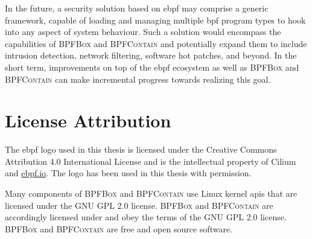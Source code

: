 \documentclass[
  fontsize=12pt,
  titlepage=firstiscover,
  paper=letter,
oneside,
  cleardoublepage=plain,
  parskip=half-,
  DIV=10,
  parindent,
  appendixprefix,
  chapterprefix,
  listof=totoc,
]{scrbook}
\newcommand{\bpfbox}{\textsc{BPFBox}}
\newcommand{\bpfcontain}{\textsc{BPFContain}}
\begin{document}
In the future, a security solution based on \gls{ebpf} may comprise a generic framework,
capable of loading and managing multiple \gls{bpf} program types to hook into any aspect
of system behaviour. Such a solution would encompass the capabilities of \bpfbox{} and
\bpfcontain{} and potentially expand them to include intrusion detection, network
filtering, software hot patches, and beyond. In the short term, improvements on top of the
\gls{ebpf} ecosystem as well as \bpfbox{} and \bpfcontain{} can make incremental progress
towards realizing this goal.
 


\cleardoublepage \printbibliography[heading=bibintoc]

\appendix \printglossary[type=\acronymtype, title=List of Acronyms, toctitle=List of Acronyms]

\chapter{License Attribution}

The \gls{ebpf} logo used in this thesis is licensed under the Creative Commons Attribution
4.0 International License and is the intellectual property of Cilium and \url{ebpf.io}.
The logo has been used in this thesis with permission.

Many components of \bpfbox{} and \bpfcontain{} use Linux kernel \glspl{api} that are
licensed under the GNU GPL 2.0 license. \bpfbox{} and \bpfcontain{} are accordingly
licensed under and obey the terms of the GNU GPL 2.0 license. \bpfbox{} and \bpfcontain{}
are free and open source software.
\end{document}
